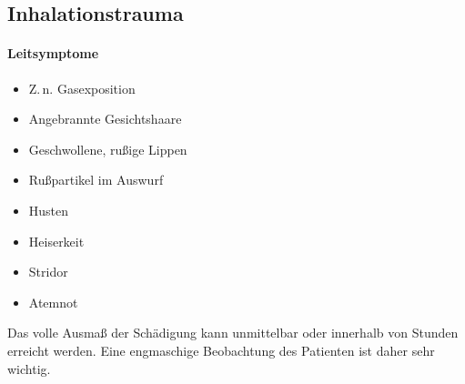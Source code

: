 \subsection{Inhalationstrauma}
\label{topic:inhalationstrauma}


\paragraph{Leitsymptome}

\begin{itemize}
  \item Z.\,n. Gasexposition
  \item Angebrannte Gesichtshaare
  \item Geschwollene, rußige Lippen
  \item Rußpartikel im Auswurf
  \item Husten
  \item Heiserkeit
  \item Stridor
  \item Atemnot
\end{itemize}

Das volle Ausmaß der Schädigung kann unmittelbar oder
innerhalb von Stunden erreicht werden. Eine engmaschige
Beobachtung des Patienten ist daher sehr wichtig.


% 
% 









